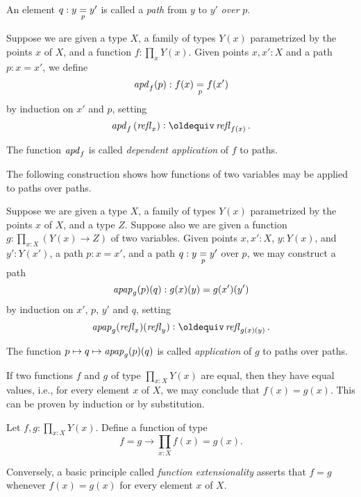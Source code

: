 An element $q : \pathover y Y p {y'}$ is called a {\em path} from $y$ to $y'$ {\em over} $p$.

\begin{definition}\label{def:apd}
  Suppose we are given a type $X$, a family of types $Y(x)$ parametrized by the points $x$ of $X$, and a function $f:\prod_x Y(x)$.
  Given points $x,x':X$ and a path $p : x = x'$, we define $$\apd{f}(p) : \pathover {f(x)} Y p {f(x')}$$ by induction on $x'$ and $p$,
  setting $$\apd f {(\refl x)} \defeq \refl {f(x)}.$$
\end{definition}

The function $\apd f$ is called {\em dependent application} of $f$ to paths.

The following construction shows how functions of two variables may be applied to paths over paths.

\begin{definition}\label{def:applfun2}
  Suppose we are given a type $X$, a family of types $Y(x)$ parametrized by the points $x$ of $X$, and a type $Z$.
  Suppose also we are given a function $g : \prod_{x:X} (Y(x) \to Z)$ of two variables.
  Given points $x,x':X$, $y:Y(x)$, and
  $y':Y(x')$, a path $p : x = x'$, and a path $q :\pathover y Y p {y'}$ over $p$,
  we may construct a path $$\apap g p q : g(x)(y) = g(x')(y')$$ by induction on $x'$, $p$, $y'$ and $q$,
  setting $$\apap g {\refl x}{\refl y} \defeq \refl {g(x)(y)}.$$
\end{definition}

The function $p \mapsto q \mapsto \apap g p q$ is called {\em application} of $g$ to paths over paths.


\medskip

If two functions $f$ and $g$ of type $\prod_{x:X} Y(x)$ are equal, 
then they have equal values, i.e., for every element $x$ of $X$, 
we may conclude that $f(x) = g(x)$.
This can be proven by induction or by substitution.
\begin{xca}\label{happly}
Let $f,g:\prod_{x:X} Y(x)$. Define a function of type 
\[ 
f=g \to \prod_{x:X} f(x)=g(x).
\] 
\end{xca}

Conversely, a basic principle called {\em function extensionality}
asserts that $f=g$ whenever $f(x) = g(x)$ for every element $x$ of $X$.

